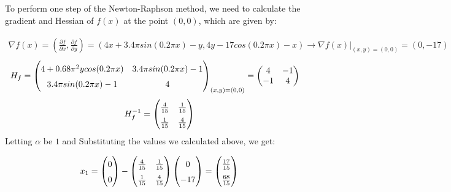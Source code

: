 \documentclass{article}
\begin{document}
\subsection{}
\subsubsection{}
To perform one step of the Newton-Raphson method, we need to calculate the gradient and Hessian of $f(x)$ at the point $(0,0)$, which are given by:

\begin{align*}
\nabla f(x) = (\frac{\partial f}{\partial x}, \frac{\partial f}{\partial y}) = (4x + 3.4\pi sin(0.2 \pi x) - y, 4y - 17cos(0.2 \pi x) - x) \rightarrow \nabla f(x)\rvert_{(x,y) = (0,0)} = (0, -17)
\end{align*}
\begin{align*}
    H_f &= 
    \begingroup
    \renewcommand{\arraystretch}{1.5}
    \begin{pmatrix}
    4 + 0.68 \pi^{2} y cos(0.2 \pi x) & 3.4 \pi sin(0.2 \pi x) - 1 \\
    3.4 \pi sin(0.2 \pi x) - 1 & 4
    \end{pmatrix}_{(x,y) = (0,0)} = 
    \renewcommand{\arraystretch}{1}
    \begin{pmatrix}
    4 & - 1 \\
    - 1 & 4
    \end{pmatrix}
    \endgroup
\end{align*}
\begin{equation}
    H_{f}^{-1} = 
    \begingroup
    \renewcommand{\arraystretch}{1.5}
    \begin{pmatrix}
    \frac{4}{15} & \frac{1}{15} \\
    \frac{1}{15} & \frac{4}{15}
    \end{pmatrix}
    \endgroup
\end{equation}
Letting $\alpha$ be $1$ and Substituting the values we calculated above, we get:

\begin{equation}
x_{1} =
\begingroup
\renewcommand{\arraystretch}{1.5}
\begin{pmatrix}
0 \\ 0
\end{pmatrix} - \begin{pmatrix}
    \frac{4}{15} & \frac{1}{15} \\
    \frac{1}{15} & \frac{4}{15}
    \end{pmatrix} \begin{pmatrix}
    0 \\ -17
    \end{pmatrix} = 
    \begin{pmatrix}
    \frac{17}{15} \\
    \frac{68}{15}
    \end{pmatrix}
\endgroup
\end{equation}
\end{document}
